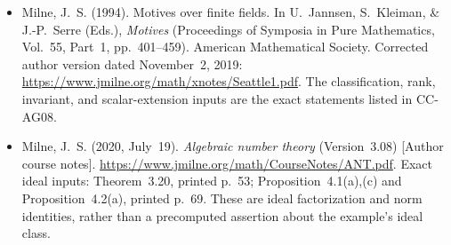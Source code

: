\begin{itemize}
\item Milne, J.~S. (1994). Motives over finite fields. In
U.~Jannsen, S.~Kleiman, \& J.-P.~Serre (Eds.),
\emph{Motives} (Proceedings of Symposia in Pure Mathematics,
Vol.~55, Part~1, pp.~401--459). American Mathematical
Society. Corrected author version dated November~2, 2019:
\url{https://www.jmilne.org/math/xnotes/Seattle1.pdf}.
The classification, rank, invariant, and scalar-extension
inputs are the exact statements listed in CC-AG08.
\item Milne, J.~S. (2020, July~19).
\emph{Algebraic number theory} (Version~3.08)
[Author course notes].
\url{https://www.jmilne.org/math/CourseNotes/ANT.pdf}.
Exact ideal inputs: Theorem~3.20, printed p.~53;
Proposition~4.1(a),(c) and Proposition~4.2(a),
printed p.~69.  These are ideal factorization and norm
identities, rather than a precomputed assertion about
the example's ideal class.
\end{itemize}
